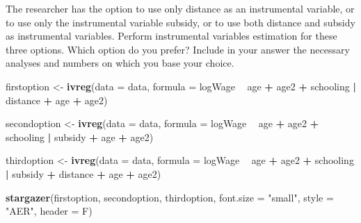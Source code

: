 \documentclass[
]{article}
\newenvironment{Shaded}{\begin{snugshade}}{\end{snugshade}}
\newcommand{\DataTypeTok}[1]{\textcolor[rgb]{0.13,0.29,0.53}{#1}}
\newcommand{\KeywordTok}[1]{\textcolor[rgb]{0.13,0.29,0.53}{\textbf{#1}}}
\newcommand{\NormalTok}[1]{#1}
\newcommand{\OperatorTok}[1]{\textcolor[rgb]{0.81,0.36,0.00}{\textbf{#1}}}
\newcommand{\StringTok}[1]{\textcolor[rgb]{0.31,0.60,0.02}{#1}}
\begin{document}
The researcher has the option to use only distance as an instrumental
variable, or to use only the instrumental variable subsidy, or to use
both distance and subsidy as instrumental variables. Perform
instrumental variables estimation for these three options. Which option
do you prefer? Include in your answer the necessary analyses and numbers
on which you base your choice.

\begin{Shaded}
\begin{Highlighting}[]
\NormalTok{firstoption <-}\StringTok{ }\KeywordTok{ivreg}\NormalTok{(}\DataTypeTok{data =}\NormalTok{ data, }\DataTypeTok{formula =} 
\NormalTok{                         logWage }\OperatorTok{~}\StringTok{ }\NormalTok{age }\OperatorTok{+}\StringTok{ }\NormalTok{age2 }\OperatorTok{+}\StringTok{ }\NormalTok{schooling }\OperatorTok{|}\StringTok{ }\NormalTok{distance }\OperatorTok{+}\StringTok{ }\NormalTok{age }\OperatorTok{+}\StringTok{ }\NormalTok{age2)}

\NormalTok{secondoption <-}\StringTok{ }\KeywordTok{ivreg}\NormalTok{(}\DataTypeTok{data =}\NormalTok{ data, }\DataTypeTok{formula =}
\NormalTok{                          logWage }\OperatorTok{~}\StringTok{ }\NormalTok{age }\OperatorTok{+}\StringTok{ }\NormalTok{age2 }\OperatorTok{+}\StringTok{ }\NormalTok{schooling }\OperatorTok{|}\StringTok{ }\NormalTok{subsidy }\OperatorTok{+}\StringTok{ }\NormalTok{age }\OperatorTok{+}\StringTok{ }\NormalTok{age2)}

\NormalTok{thirdoption <-}\StringTok{ }\KeywordTok{ivreg}\NormalTok{(}\DataTypeTok{data =}\NormalTok{ data, }\DataTypeTok{formula =}
\NormalTok{                          logWage }\OperatorTok{~}\StringTok{ }\NormalTok{age }\OperatorTok{+}\StringTok{ }\NormalTok{age2 }\OperatorTok{+}\StringTok{ }\NormalTok{schooling }\OperatorTok{|}\StringTok{ }\NormalTok{subsidy }\OperatorTok{+}\StringTok{ }\NormalTok{distance }\OperatorTok{+}\StringTok{ }\NormalTok{age }
                     \OperatorTok{+}\StringTok{ }\NormalTok{age2)}
\end{Highlighting}
\end{Shaded}

\begin{Shaded}
\begin{Highlighting}[]
\KeywordTok{stargazer}\NormalTok{(firstoption, secondoption, thirdoption, }\DataTypeTok{font.size =} \StringTok{"small"}\NormalTok{, }
          \DataTypeTok{style =} \StringTok{"AER"}\NormalTok{, }
          \DataTypeTok{header =}\NormalTok{ F)}
\end{Highlighting}
\end{Shaded}
\end{document}
